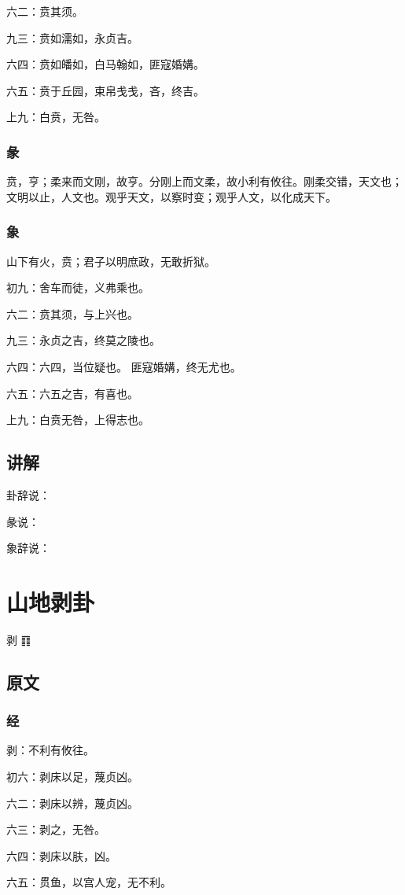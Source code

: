 \documentclass[12pt,oneside]{book}
\begin{document}
六二：贲其须。

九三：贲如濡如，永贞吉。

六四：贲如皤如，白马翰如，匪寇婚媾。

六五：贲于丘园，束帛戋戋，吝，终吉。

上九：白贲，无咎。

\subsection{彖}
贲，亨；柔来而文刚，故亨。分刚上而文柔，故小利有攸往。刚柔交错，天文也；文明以止，人文也。观乎天文，以察时变；观乎人文，以化成天下。
\subsection{象}
山下有火，贲；君子以明庶政，无敢折狱。

初九：舍车而徒，义弗乘也。

六二：贲其须，与上兴也。

九三：永贞之吉，终莫之陵也。

六四：六四，当位疑也。 匪寇婚媾，终无尤也。

六五：六五之吉，有喜也。

上九：白贲无咎，上得志也。

\section{讲解}
卦辞说：

彖说：

象辞说：


\chapter{山地剥卦}
剥 {\Large ䷖}

\section{原文}
\subsection{经}
剥：不利有攸往。

初六：剥床以足，蔑贞凶。

六二：剥床以辨，蔑贞凶。

六三：剥之，无咎。

六四：剥床以肤，凶。

六五：贯鱼，以宫人宠，无不利。
\end{document}
